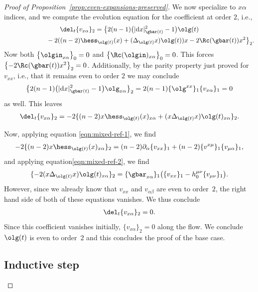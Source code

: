 \begin{proof}[Proof of Proposition~\ref{prop:even-expansions-preserved}]
We now specialize to $x\alpha$ indices, and we compute the evolution equation for the coefficient at order $2$, i.e.,
\begin{gather*}
\del_t \{ v_{x\alpha} \}_{2}
 =\big\{ 2 (n-1) \big(|{\rm d}x|^2_{\gbar(t)} -1\big) \olg(t) \\
 \hphantom{\del_t \{ v_{x\alpha} \}_{2}=}{} -2 ( (n-2) \hess_{\olg(t)} (x) + (\Delta_{\olg(t)} x) \olg(t) ) x -2 \Rc(\gbar(t)) x^2 \big\}_2.
\end{gather*}
Now both $\big\{ \olgin_{x\alpha} \big\}_0 = 0$ and $\big\{\Rc(\olgin)_{x\alpha} \big\}_0 = 0$. This forces $\big\{ {-}2 \Rc(\gbar(t)) x^2 \big\}_2 = 0$. Additionally, by the parity property just proved for~$v_{xx}$, i.e., that it remains even to order $2$ we may conclude
\begin{gather*}
\big\{2 (n-1) \big(|{\rm d}x|^2_{\gbar(t)} -1\big) \olg_{x\alpha} \big\}_{2} = 2(n-1)\{\olg^{xx}\}_1 \{ v_{x\alpha}\}_1 = 0
\end{gather*}
as well. This leaves
\begin{gather*}
\del_t \{ v_{x\alpha} \}_{2} = -2 \{ (n-2) x\hess_{\olg(t)} (x)_{x\alpha} + (x \Delta_{\olg(t)} x) \olg(t)_{x\alpha} \}_2.
\end{gather*}

Now, applying equation \eqref{eqn:mixed-ref-1}, we find
\begin{gather*}
-2 \{ (n-2) x\hess_{\olg(t)} (x)_{x\alpha} \}_{2} = (n-2)\partial_{\alpha} \{v_{xx}\}_1 + (n-2)\{ v^{x \mu} \}_1 \{ v_{\mu \alpha}\}_1,
\end{gather*}
and applying equation\eqref{eqn:mixed-ref-2}, we find
\begin{gather*}
\{ -2 (x\Delta_{\olg(t)} x) \olg(t)_{x\alpha} \}_2 = \{\gbar_{x \alpha}\}_1 \big( \{v_{xx}\}_1 - h_0^{\mu \nu} \{v_{\mu\nu}\}_1\big).
\end{gather*}
However, since we already know that $v_{xx}$ and $v_{\alpha \beta}$ are even to order~$2$, the right hand side of both of these equations vanishes. We thus conclude
\begin{gather*}
\del_t \{ v_{x\alpha} \}_{2} = 0.
\end{gather*}
Since this coefficient vanishes initially, $\{v_{x\alpha}\}_2 = 0$ along the flow. We conclude $\olg(t)$ is even to order~$2$ and this concludes the proof of the base case.

\subsection*{Inductive step}


\end{proof}
